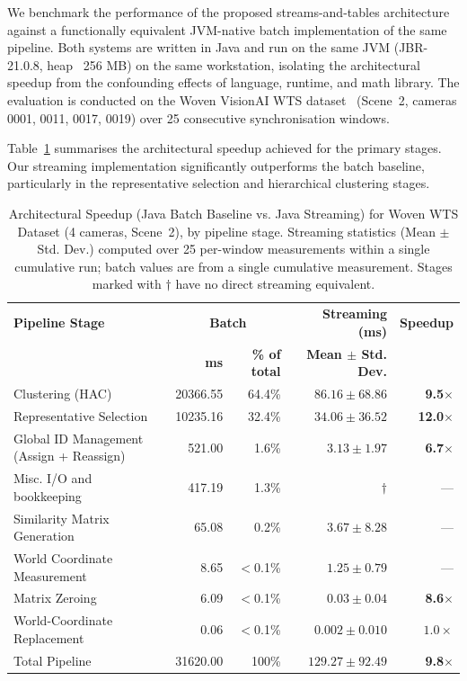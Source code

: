 \documentclass[5p,times]{elsarticle}
\begin{document}
We benchmark the performance of the proposed streams-and-tables architecture against a functionally equivalent JVM-native batch implementation of the same pipeline. Both systems are written in Java and run on the same JVM (JBR-21.0.8, heap ~256 MB) on the same workstation, isolating the architectural speedup from the confounding effects of language, runtime, and math library. The evaluation is conducted on the Woven VisionAI WTS dataset~\cite{kong2024wts} (Scene~2, cameras 0001, 0011, 0017, 0019) over 25 consecutive synchronisation windows.

Table~\ref{tab:performance_combined} summarises the architectural speedup achieved for the primary stages. Our streaming implementation significantly outperforms the batch baseline, particularly in the representative selection and hierarchical clustering stages.

\begin{table}[tbh!]
    \centering
    \caption{Architectural Speedup (Java Batch Baseline vs. Java Streaming) for Woven WTS
    Dataset (4 cameras, Scene~2), by pipeline stage. Streaming statistics (Mean $\pm$ Std.
    Dev.) computed over 25 per-window measurements within a single cumulative run; batch
    values are from a single cumulative measurement. Stages marked with $\dagger$
    have no direct streaming equivalent.}
    \label{tab:performance_combined}
    \small
    \begin{tabular}{@{}l|rr|rr@{}}
        \toprule
        \textbf{Pipeline Stage} & \multicolumn{2}{c|}{\textbf{Batch}} & \textbf{Streaming (ms)} & \textbf{Speedup} \\
        & \textbf{ms} & \textbf{\% of total} & \textbf{Mean $\pm$ Std. Dev.} & \\ \midrule
        Clustering (HAC) & 20366.55 & 64.4\% & $86.16 \pm 68.86$ & \textbf{9.5$\times$} \\
        Representative Selection & 10235.16 & 32.4\% & $34.06 \pm 36.52$ & \textbf{12.0$\times$} \\
        Global ID Management (Assign + Reassign) & 521.00 & 1.6\% & $3.13 \pm 1.97$ & \textbf{6.7$\times$} \\
        Misc. I/O and bookkeeping & 417.19 & 1.3\% & $\dagger$ & --- \\
        Similarity Matrix Generation & 65.08 & 0.2\% & $3.67 \pm 8.28$ & --- \\
        World Coordinate Measurement & 8.65 & $<$0.1\% & $1.25 \pm 0.79$ & --- \\
        Matrix Zeroing & 6.09 & $<$0.1\% & $0.03 \pm 0.04$ & \textbf{8.6$\times$} \\
        World-Coordinate Replacement & 0.06 & $<$0.1\% & $0.002 \pm 0.010$ & $1.0\times$ \\
        \midrule
        Total Pipeline & 31620.00 & 100\% & $129.27 \pm 92.49$ & \textbf{9.8$\times$} \\
        \bottomrule
    \end{tabular}
\end{table}
\end{document}
